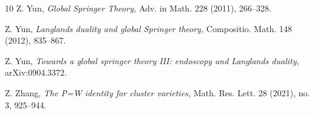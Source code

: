 \documentclass[11pt]{amsart}
\theoremstyle{plain}
\theoremstyle{definition}
\theoremstyle{remark}
\begin{document}
\begin{thebibliography}{10}
 Z. Yun, {\em Global Springer Theory,} Adv. in Math. 228 (2011), 266--328. 

 Z. Yun, {\em Langlands duality and global Springer theory,} Compositio. Math. 148 (2012), 835--867.

 Z. Yun, {\em Towards a global springer theory III: endoscopy and Langlands duality,} arXiv:0904.3372.

 Z. Zhang, {\em The P=W identity for cluster varieties,} Math. Res. Lett. 28 (2021), no. 3, 925--944. 


\end{thebibliography}
\end{document}
